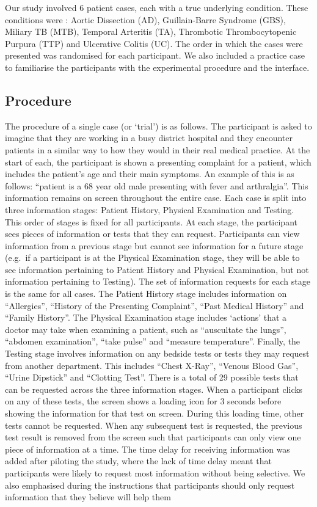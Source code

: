 \documentclass[a4paper, nobind]{templates/ociamthesis}
\begin{document}
Our study involved 6 patient cases, each with a true underlying condition. These conditions were : Aortic Dissection (AD), Guillain-Barre Syndrome (GBS), Miliary TB (MTB), Temporal Arteritis (TA), Thrombotic Thrombocytopenic Purpura (TTP) and Ulcerative Colitis (UC). The order in which the cases were presented was randomised for each participant. We also included a practice case to familiarise the participants with the experimental procedure and the interface.

\subsection*{Procedure}\label{procedure}

The procedure of a single case (or `trial') is as follows. The participant is asked to imagine that they are working in a busy district hospital and they encounter patients in a similar way to how they would in their real medical practice. At the start of each, the participant is shown a presenting complaint for a patient, which includes the patient's age and their main symptoms. An example of this is as follows: ``patient is a 68 year old male presenting with fever and arthralgia''. This information remains on screen throughout the entire case. Each case is split into three information stages: Patient History, Physical Examination and Testing. This order of stages is fixed for all participants. At each stage, the participant sees pieces of information or tests that they can request. Participants can view information from a previous stage but cannot see information for a future stage (e.g.~if a participant is at the Physical Examination stage, they will be able to see information pertaining to Patient History and Physical Examination, but not information pertaining to Testing). The set of information requests for each stage is the same for all cases. The Patient History stage includes information on ``Allergies'', ``History of the Presenting Complaint'', ``Past Medical History'' and ``Family History''. The Physical Examination stage includes `actions' that a doctor may take when examining a patient, such as ``auscultate the lungs'', ``abdomen examination'', ``take pulse'' and ``measure temperature''. Finally, the Testing stage involves information on any bedside tests or tests they may request from another department. This includes ``Chest X-Ray'', ``Venous Blood Gas'', ``Urine Dipstick'' and ``Clotting Test''. There is a total of 29 possible tests that can be requested across the three information stages. When a participant clicks on any of these tests, the screen shows a loading icon for 3 seconds before showing the information for that test on screen. During this loading time, other tests cannot be requested. When any subsequent test is requested, the previous test result is removed from the screen such that participants can only view one piece of information at a time. The time delay for receiving information was added after piloting the study, where the lack of time delay meant that participants were likely to request most information without being selective. We also emphasised during the instructions that participants should only request information that they believe will help them 
\end{document}
